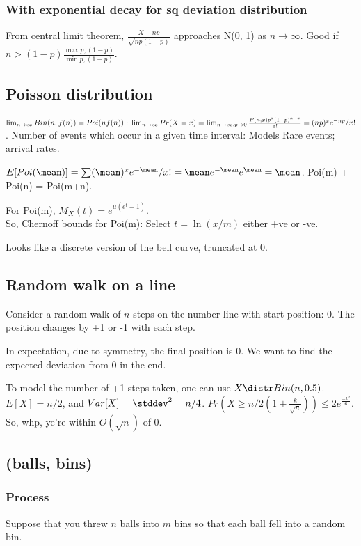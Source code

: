 \documentclass[oneside, article]{memoir}
\begin{document}
\subsubsection{With exponential decay for sq deviation distribution}
From central limit theorem, $\frac{X - np}{\sqrt{np(1-p)}}$ approaches N(0, 1) as $n \to \infty$. Good if $n > (1-p)\frac{\max p, (1-p)}{\min p, (1-p)}$.

\subsection{Poisson distribution}
$\lim_{n\to \infty} Bin(n,f(n)) = Poi(nf(n)):\\
 \lim_{n\to \infty} Pr(X = x) = \lim_{n\to \infty, p \to 0} \frac{P(n, x) p^{x}(1-p)^{n-x}}{x!} = (np)^{x}e^{-np}/x!$. Number of events which occur in a given time interval: Models Rare events; arrival rates.

$E[Poi(\mean)]= \sum (\mean)^{x}e^{-\mean}/x! = \mean e^{-\mean} e^{\mean} = \mean$. Poi(m) + Poi(n) = Poi(m+n).

For Poi(m), $M_{X}(t) = e^{\mu(e^{t}-1)}$. \\
So, Chernoff bounds for Poi(m): Select $t=\ln(x/m)$ either +ve or -ve.

Looks like a discrete version of the bell curve, truncated at 0.

\subsection{Random walk on a line}
Consider a random walk of $n$ steps on the number line with start position: 0. The position changes by +1 or -1 with each step.

In expectation, due to symmetry, the final position is 0. We want to find the expected deviation from 0 in the end.

To model the number of +1 steps taken, one can use $X \distr Bin(n, 0.5)$. $E[X] = n/2$, and $Var[X] = \stddev^{2} = n/4$. $Pr(X \geq n/2(1 + \frac{k}{\sqrt{n}})) \leq 2e^{\frac{-k^{2}}{6}}$. So, whp, ye're within $O(\sqrt{n})$ of 0.

\subsection{(balls, bins)}
\subsubsection{Process}
Suppose that you threw $n$ balls into $m$ bins so that each ball fell into a random bin.
\end{document}
